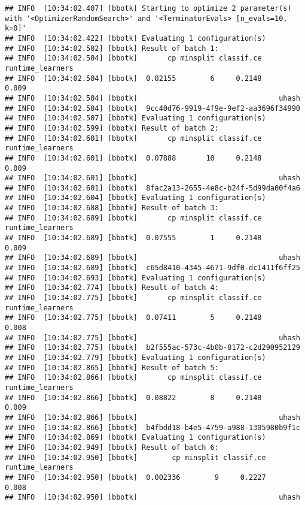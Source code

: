 \documentclass[
]{scrbook}
\begin{document}
\begin{verbatim}
## INFO  [10:34:02.407] [bbotk] Starting to optimize 2 parameter(s) with '<OptimizerRandomSearch>' and '<TerminatorEvals> [n_evals=10, k=0]' 
## INFO  [10:34:02.422] [bbotk] Evaluating 1 configuration(s) 
## INFO  [10:34:02.502] [bbotk] Result of batch 1: 
## INFO  [10:34:02.504] [bbotk]       cp minsplit classif.ce runtime_learners 
## INFO  [10:34:02.504] [bbotk]  0.02155        6     0.2148            0.009 
## INFO  [10:34:02.504] [bbotk]                                 uhash 
## INFO  [10:34:02.504] [bbotk]  9cc40d76-9919-4f9e-9ef2-aa3696f34990 
## INFO  [10:34:02.507] [bbotk] Evaluating 1 configuration(s) 
## INFO  [10:34:02.599] [bbotk] Result of batch 2: 
## INFO  [10:34:02.601] [bbotk]       cp minsplit classif.ce runtime_learners 
## INFO  [10:34:02.601] [bbotk]  0.07888       10     0.2148            0.009 
## INFO  [10:34:02.601] [bbotk]                                 uhash 
## INFO  [10:34:02.601] [bbotk]  8fac2a13-2655-4e8c-b24f-5d99da00f4a6 
## INFO  [10:34:02.604] [bbotk] Evaluating 1 configuration(s) 
## INFO  [10:34:02.688] [bbotk] Result of batch 3: 
## INFO  [10:34:02.689] [bbotk]       cp minsplit classif.ce runtime_learners 
## INFO  [10:34:02.689] [bbotk]  0.07555        1     0.2148            0.009 
## INFO  [10:34:02.689] [bbotk]                                 uhash 
## INFO  [10:34:02.689] [bbotk]  c65d8410-4345-4671-9df0-dc1411f6ff25 
## INFO  [10:34:02.693] [bbotk] Evaluating 1 configuration(s) 
## INFO  [10:34:02.774] [bbotk] Result of batch 4: 
## INFO  [10:34:02.775] [bbotk]       cp minsplit classif.ce runtime_learners 
## INFO  [10:34:02.775] [bbotk]  0.07411        5     0.2148            0.008 
## INFO  [10:34:02.775] [bbotk]                                 uhash 
## INFO  [10:34:02.775] [bbotk]  b2f555ac-573c-4b0b-8172-c2d290952129 
## INFO  [10:34:02.779] [bbotk] Evaluating 1 configuration(s) 
## INFO  [10:34:02.865] [bbotk] Result of batch 5: 
## INFO  [10:34:02.866] [bbotk]       cp minsplit classif.ce runtime_learners 
## INFO  [10:34:02.866] [bbotk]  0.08822        8     0.2148            0.009 
## INFO  [10:34:02.866] [bbotk]                                 uhash 
## INFO  [10:34:02.866] [bbotk]  b4fbdd18-b4e5-4759-a988-1305980b9f1c 
## INFO  [10:34:02.869] [bbotk] Evaluating 1 configuration(s) 
## INFO  [10:34:02.949] [bbotk] Result of batch 6: 
## INFO  [10:34:02.950] [bbotk]        cp minsplit classif.ce runtime_learners 
## INFO  [10:34:02.950] [bbotk]  0.002336        9     0.2227            0.008 
## INFO  [10:34:02.950] [bbotk]                                 uhash 

\end{verbatim}
\end{document}
